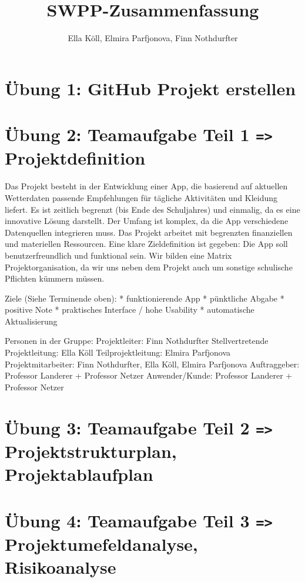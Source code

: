 \documentclass[ngerman]{report}
\title{SWPP-Zusammenfassung}
\author{Ella Köll, Elmira Parfjonova, Finn Nothdurfter}
\begin{document}
    \maketitle
    \tableofcontents



    \chapter{Übung 1: GitHub Projekt erstellen}



    \chapter{Übung 2: Teamaufgabe Teil 1 \texttt{=>} Projektdefinition}
    

Das Projekt besteht in der Entwicklung einer App, die basierend auf aktuellen Wetterdaten passende Empfehlungen für tägliche Aktivitäten und Kleidung liefert. Es ist zeitlich begrenzt (bis Ende des Schuljahres) und einmalig, da es eine innovative Lösung darstellt. Der Umfang ist komplex, da die App verschiedene Datenquellen integrieren muss. Das Projekt arbeitet mit begrenzten finanziellen und materiellen Ressourcen. Eine klare Zieldefinition ist gegeben: Die App soll benutzerfreundlich und funktional sein.
Wir bilden eine Matrix Projektorganisation, da wir uns neben dem Projekt auch um sonstige schulische Pflichten kümmern müssen.

Ziele (Siehe Terminende oben):
*   funktionierende App
*   pünktliche Abgabe
*   positive Note
*   praktisches Interface / hohe Usability
*   automatische Aktualisierung

Personen in der Gruppe:
Projektleiter: Finn Nothdurfter
Stellvertretende Projektleitung: Ella Köll
Teilprojektleitung: Elmira Parfjonova
Projektmitarbeiter: Finn Nothdurfter, Ella Köll, Elmira Parfjonova
Auftraggeber: Professor Landerer + Professor Netzer
Anwender/Kunde: Professor Landerer + Professor Netzer


    \chapter{Übung 3: Teamaufgabe Teil 2 \texttt{=>} Projektstrukturplan, Projektablaufplan}



    \chapter{Übung 4: Teamaufgabe Teil 3 \texttt{=>} Projektumefeldanalyse, Risikoanalyse}
\end{document}
